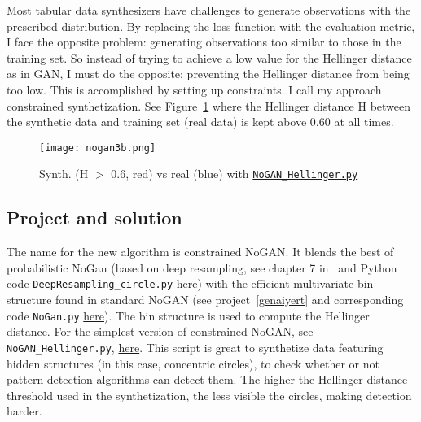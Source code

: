 \documentclass[oneside,10pt]{book}
\begin{document}
\noindent Most tabular data synthesizers have challenges to generate observations with the prescribed distribution. By replacing the loss function with the
 evaluation metric, I face the opposite problem: generating observations too similar to those in the training set. So instead of trying to achieve a low value
 for the Hellinger distance as in GAN, I must do the opposite:  preventing the Hellinger distance from being too low. This is
 accomplished by setting up constraints. I call my approach \textcolor{index}{constrained synthetization}. 
See Figure~\ref{fig:xc1oh6} where the Hellinger distance H between the synthetic data and training set (real data) is kept above 0.60 at all times.

\begin{figure}[H]
\centering
\texttt{[image: nogan3b.png]}   
\caption{Synth. \hspace{-0.5ex}(H $>$ 0.6, red) vs real (blue) with \href{https://github.com/VincentGranville/Main/blob/main/NoGAN_Hellinger.py}{\texttt{NoGAN\_Hellinger.py}}}
\label{fig:xc1oh6}
\end{figure}

\subsection{Project and solution}

The name for the new algorithm is  \textcolor{index}{constrained NoGAN}. It blends the best of 
\textcolor{index}{probabilistic NoGan} (based on deep \textcolor{index}{resampling}, see 
chapter 7 in~\cite{vgmloptim} and Python code \texttt{DeepResampling\_circle.py}
\href{https://github.com/VincentGranville/Main/blob/main/DeepResampling_circle.py}{here}) with the
 efficient multivariate \textcolor{index}{bin structure} found in 
\textcolor{index}{standard NoGAN} 
(see project~\ref{genaiyert} and corresponding code \texttt{NoGan.py} \href{https://github.com/VincentGranville/Main/blob/main/NoGAN.py}{here}). 
The bin structure is used to compute the Hellinger distance.
For the simplest version of constrained NoGAN, see \texttt{NoGAN\_Hellinger.py}, \href{https://github.com/VincentGranville/Main/blob/main/NoGAN_Hellinger.py}{here}. 
This script is great to synthetize data featuring hidden structures (in this case, concentric circles), to check whether or not pattern detection algorithms 
can detect them. The higher the Hellinger distance threshold used in the synthetization, the less visible the circles, making
 detection harder.
\end{document}
